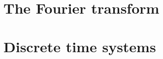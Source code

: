 \documentclass[11pt,a4paper]{book}
\title{\mytitle}
\author{Robby McKilliam}
\theoremstyle{plain}
\numberwithin{equation}{section}
\begin{document}
\frontmatter
\pagestyle{front}
\maketitle

\setcounter{tocdepth}{1}

\tableofcontents
  
\mainmatter
\pagestyle{main}

%  
%  

%  
%  

%  
%  

%  
%  

\chapter{The Fourier transform}\label{sec:fourier-transform}
 
 

\chapter{Discrete time systems} \label{cha:discr-time-syst}
 
 




\pagestyle{back}


\end{document}
